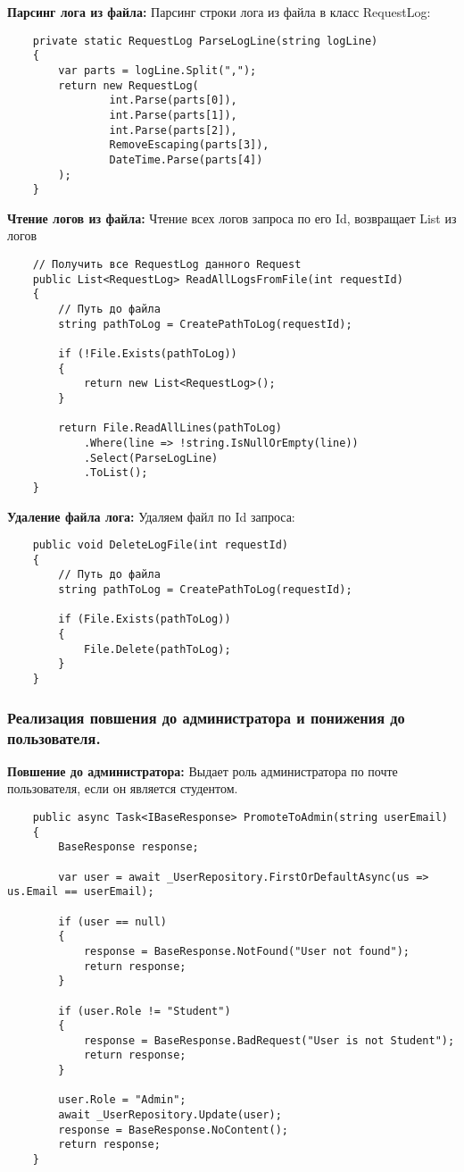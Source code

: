 \textbf{Парсинг лога из файла:} Парсинг строки лога из файла в класс RequestLog:
\begin{verbatim}
    private static RequestLog ParseLogLine(string logLine)
    {
        var parts = logLine.Split(",");
        return new RequestLog(
                int.Parse(parts[0]),
                int.Parse(parts[1]),
                int.Parse(parts[2]),
                RemoveEscaping(parts[3]),
                DateTime.Parse(parts[4])
        );
    }
\end{verbatim}

\textbf{Чтение логов из файла:} Чтение всех логов запроса по его Id, возвращает List из логов
\begin{verbatim}
    // Получить все RequestLog данного Request
    public List<RequestLog> ReadAllLogsFromFile(int requestId)
    {
        // Путь до файла
        string pathToLog = CreatePathToLog(requestId);

        if (!File.Exists(pathToLog))
        {
            return new List<RequestLog>();
        }

        return File.ReadAllLines(pathToLog)
            .Where(line => !string.IsNullOrEmpty(line))
            .Select(ParseLogLine)
            .ToList();
    }
\end{verbatim}

\textbf{Удаление файла лога:} Удаляем файл по Id запроса:
\begin{verbatim}
    public void DeleteLogFile(int requestId)
    {
        // Путь до файла
        string pathToLog = CreatePathToLog(requestId);

        if (File.Exists(pathToLog))
        {
            File.Delete(pathToLog);
        }
    }
\end{verbatim}

\subsubsection{Реализация повшения до администратора и понижения до пользователя.}

\textbf{Повшение до администратора:} Выдает роль администратора по почте пользователя, если он является студентом.
\begin{verbatim}
    public async Task<IBaseResponse> PromoteToAdmin(string userEmail)
    {
        BaseResponse response;

        var user = await _UserRepository.FirstOrDefaultAsync(us => us.Email == userEmail);

        if (user == null)
        {
            response = BaseResponse.NotFound("User not found");
            return response;
        }

        if (user.Role != "Student")
        {
            response = BaseResponse.BadRequest("User is not Student");
            return response;
        }

        user.Role = "Admin";
        await _UserRepository.Update(user);
        response = BaseResponse.NoContent();
        return response;
    }
\end{verbatim}

